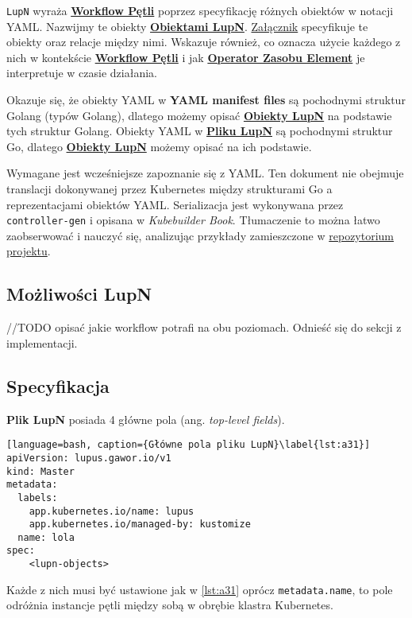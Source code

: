 \texttt{LupN} wyraża \hyperlink{def:workflow-petli}{\textbf{Workflow Pętli}} poprzez specyfikację różnych obiektów w notacji YAML. Nazwijmy te obiekty \hyperlink{def:obiekt-lupn}{\textbf{Obiektami LupN}}. \hyperref[appendix://TODO]{Załącznik} specyfikuje te obiekty oraz relacje między nimi. Wskazuje również, co oznacza użycie każdego z nich w kontekście \hyperlink{def:workflow-petli}{\textbf{Workflow Pętli}} i jak \hyperlink{def:operator-zasobu-element}{\textbf{Operator Zasobu Element}} je interpretuje w czasie działania.

Okazuje się, że obiekty YAML w \textbf{YAML manifest files} są pochodnymi struktur Golang (typów Golang), dlatego możemy opisać \hyperlink{def:obiekt-lupn}{\textbf{Obiekty LupN}} na podstawie tych struktur Golang. Obiekty YAML w \hyperlink{def:plik-lupn}{\textbf{Pliku LupN}} są pochodnymi struktur Go, dlatego \hyperlink{def:obiekt-lupn}{\textbf{Obiekty LupN}} możemy opisać na ich podstawie. 

Wymagane jest wcześniejsze zapoznanie się z YAML. Ten dokument nie obejmuje translacji dokonywanej przez Kubernetes między strukturami Go a reprezentacjami obiektów YAML. Serializacja jest wykonywana przez \texttt{controller-gen} i opisana w \textit{Kubebuilder Book}. Tłumaczenie to można łatwo zaobserwować i nauczyć się, analizując przykłady zamieszczone w \hyperref[appendix://TODO]{repozytorium projektu}.

\subsection{Możliwości LupN}

//TODO opisać jakie workflow potrafi na obu poziomach. Odnieść się do sekcji z implementacji.

\subsection{Specyfikacja}

\textbf{Plik LupN} posiada 4 główne pola (ang. \textit{top-level fields}).

\begin{lstlisting}[language=bash, caption={Główne pola pliku LupN}\label{lst:a31}]
apiVersion: lupus.gawor.io/v1
kind: Master
metadata:
  labels:
    app.kubernetes.io/name: lupus
    app.kubernetes.io/managed-by: kustomize
  name: lola
spec:
	<lupn-objects>
\end{lstlisting}

Każde z nich musi być ustawione jak w \ref{lst:a31} oprócz \texttt{metadata.name}, to pole odróżnia instancje pętli między sobą w obrębie klastra Kubernetes.

